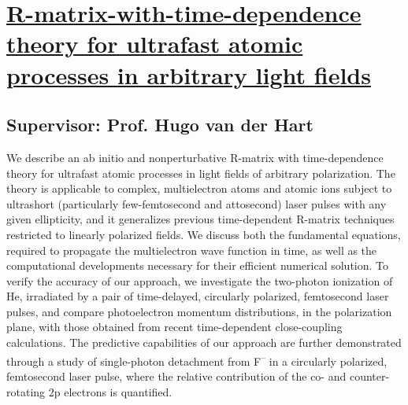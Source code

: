 \section{\href{https://doi.org/10.1103/PhysRevA.98.053442}{R-matrix-with-time-dependence theory for ultrafast atomic processes in arbitrary light fields}}

\subsection*{Supervisor: Prof. Hugo van der Hart}



We describe an ab initio and nonperturbative R-matrix with time-dependence 
theory for ultrafast atomic processes in light fields of arbitrary 
polarization. The theory is applicable to complex, multielectron atoms and 
atomic ions subject to ultrashort (particularly few-femtosecond and attosecond) 
laser pulses with any given ellipticity, and it generalizes previous 
time-dependent R-matrix techniques restricted to linearly polarized fields. We 
discuss both the fundamental equations, required to propagate the multielectron 
wave function in time, as well as the computational developments necessary for
their efficient numerical solution. To verify the accuracy of our approach, we 
investigate the two-photon ionization of He, irradiated by a pair of 
time-delayed, circularly polarized, femtosecond laser pulses, and compare 
photoelectron momentum distributions, in the polarization plane, with those 
obtained from recent time-dependent close-coupling calculations. The predictive 
capabilities of our approach are further demonstrated through a study of 
single-photon detachment from F\textsuperscript{--} in a circularly polarized, 
femtosecond laser pulse, where the relative contribution of the co- and 
counter-rotating 2p electrons is quantified.
